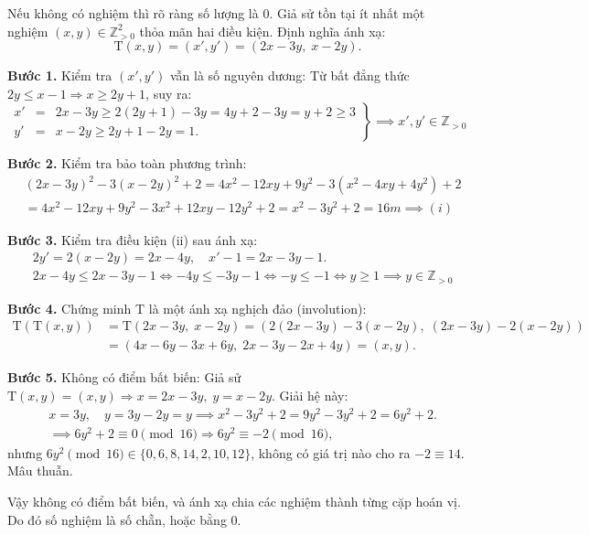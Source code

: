 \documentclass[../04-diophantine-equations.tex]{subfiles}
\begin{document}
\begin{soln}\footnotemark
    Nếu không có nghiệm thì rõ ràng số lượng là 0. Giả sử tồn tại ít nhất một nghiệm \( (x, y) \in \mathbb{Z}_{>0}^2 \) thỏa mãn hai điều kiện.
    Định nghĩa ánh xạ:
    \[
        \mathrm{T}(x, y) = (x', y') = (2x - 3y,\; x - 2y).
    \]

    \textbf{Bước 1.} Kiểm tra \( (x', y') \) vẫn là số nguyên dương:  
    Từ bất đẳng thức \( 2y \le x - 1 \Rightarrow x \ge 2y + 1 \), suy ra:
    \[
        \left.
        \begin{array}{rcl}
            x' &=& 2x - 3y \ge 2(2y + 1) - 3y = 4y + 2 - 3y = y + 2 \ge 3\\
            y' &=& x - 2y \ge 2y + 1 - 2y = 1.
        \end{array}
        \right\} \implies x', y' \in \mathbb{Z}_{>0}
    \]

    \textbf{Bước 2.} Kiểm tra bảo toàn phương trình:
    \[
        \begin{aligned}
            &(2x - 3y)^2 - 3(x - 2y)^2 + 2
            = 4x^2 - 12xy + 9y^2 - 3(x^2 - 4xy + 4y^2) + 2\\
            &= 4x^2 - 12xy + 9y^2 - 3x^2 + 12xy - 12y^2 + 2
            = x^2 - 3y^2 + 2 = 16m \implies (i)
        \end{aligned}
    \]

    \textbf{Bước 3.} Kiểm tra điều kiện (ii) sau ánh xạ:
    \[  
        \begin{aligned}
            &2y' = 2(x - 2y) = 2x - 4y,\quad x' - 1 = 2x - 3y - 1.\\
            &2x - 4y \le 2x - 3y - 1 \iff -4y \le -3y - 1 \iff -y \le -1 \iff y \ge 1 \implies y \in \mathbb{Z}_{>0}
        \end{aligned}
    \]

    \textbf{Bước 4.} Chứng minh \( \mathrm{T} \) là một ánh xạ nghịch đảo (involution):
    \[
        \begin{aligned}
            \mathrm{T}(\mathrm{T}(x, y)) &= \mathrm{T}(2x - 3y,\; x - 2y) = (2(2x - 3y) - 3(x - 2y),\; (2x - 3y) - 2(x - 2y))\\
            &= (4x - 6y - 3x + 6y,\; 2x - 3y - 2x + 4y) = (x, y).
        \end{aligned}
    \]

    \textbf{Bước 5.} Không có điểm bất biến:  
    Giả sử \( \mathrm{T}(x, y) = (x, y) \Rightarrow x = 2x - 3y,\; y = x - 2y \).  
    Giải hệ này:
    \[
        \begin{aligned}
            &x = 3y,\quad y = 3y - 2y = y \implies x^2 - 3y^2 + 2 = 9y^2 - 3y^2 + 2 = 6y^2 + 2.\\
            &\implies 6y^2 + 2 \equiv 0 \pmod{16} \Rightarrow 6y^2 \equiv -2 \pmod{16},
        \end{aligned}
    \]
    nhưng \( 6y^2 \pmod{16} \in \{0, 6, 8, 14, 2, 10, 12\} \), không có giá trị nào cho ra \( -2 \equiv 14 \). Mâu thuẫn.

    Vậy không có điểm bất biến, và ánh xạ chia các nghiệm thành từng cặp hoán vị.  
    Do đó số nghiệm là số chẵn, hoặc bằng 0.
\end{soln}

\end{document}
